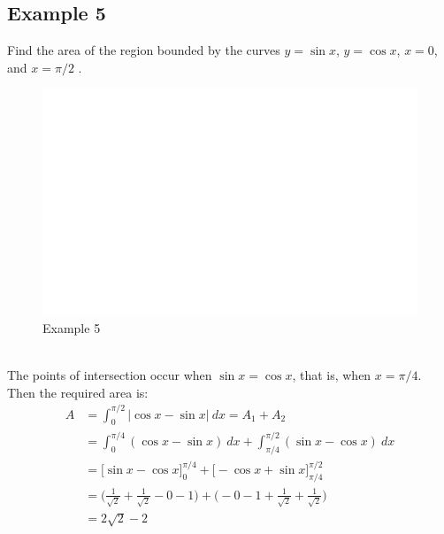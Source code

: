 \documentclass[11pt]{article}
\begin{document}
\subsection{Example 5}
Find the area of the region bounded by the curves $y = \sin x$, $y = \cos x$, $x = 0$, and $x = \pi / 2$ .
\begin{figure}[h]
    \centering
    \includegraphics[scale=0.5]{fig_6_5.png}
    \caption{Example 5}
    \label{Label}
\end{figure}
\\[8pt]
The points of intersection occur when $ \sin x = \cos x $, that is, when $ x = \pi /4 $. Then the required area is:
\begin{align*}
    A &= \int_{0}^{\pi /2}|\cos x - \sin x|\ dx = A_1 + A_2\\
    &= \int_{0}^{\pi /4}(\cos x - \sin x)\ dx + \int_{\pi /4}^{\pi /2}(\sin x - \cos x)\ dx\\
    &= \big[ \sin x - \cos x \big]_0^{\pi /4} + \big[-\cos x + \sin x \big]_{\pi / 4}^{\pi /2}\\
    &= \bigg( \frac{1}{\sqrt{2}} + \frac{1}{\sqrt{2}} - 0 - 1 \bigg) + \bigg( -0-1 + \frac{1}{\sqrt{2}} + \frac{1}{\sqrt{2}} \bigg)\\
    &= 2 \sqrt{2} - 2
\end{align*}

\pagebreak
\end{document}
